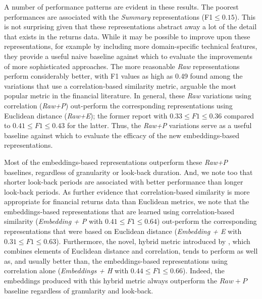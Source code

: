 \documentclass[runningheads]{llncs}
\begin{document}
A number of performance patterns are evident in these results. The poorest performances are associated with the \emph{Summary} representations (F1$\leq0.15$). This is not surprising given that these representations abstract away a lot of the detail that exists in the returns data. While it may be possible to improve upon these representations, for example by including more domain-specific technical features, they provide a useful naive baseline against which to evaluate the improvements of more sophisticated approaches. The more reasonable \emph{Raw} representations perform considerably better, with F1 values as high as 0.49 found among the variations that use a correlation-based similarity metric, arguable the most popular metric in the financial literature. In general, these \emph{Raw} variations using correlation (\emph{Raw+P}) out-perform the corresponding representations using Euclidean distance (\emph{Raw+E}); the former report with $0.33 \leq F1 \leq 0.36$ compared to $0.41 \leq F1 \leq 0.43$ for the latter. Thus, the \emph{Raw+P} variations serve as a useful baseline against which to evaluate the efficacy of the new embeddings-based representations.

Most of the embeddings-based representations outperform these \emph{Raw+P} baselines, regardless of granularity or look-back duration. And, we note too that shorter look-back periods are associated with better performance than longer look-back periods. As further evidence that correlation-based similarity is more appropriate for financial returns data than Euclidean metrics, we note that the embeddings-based representations that are learned using correlation-based similarity (\emph{Embedding + P} with $0.41 \leq F1 \leq 0.64$) out-perform the corresponding representations that were based on Euclidean distance (\emph{Embedding + E} with $0.31 \leq F1 \leq 0.63$). Furthermore, the novel, hybrid metric introduced by \cite{dolphin2021measuring}, which combines elements of Euclidean distance and correlation, tends to perform as well as, and usually better than, the embeddings-based representations using correlation alone (\emph{Embeddings + H} with $0.44 \leq F1 \leq 0.66$). Indeed, the embeddings produced with this hybrid metric always outperform the $Raw+P$ baseline regardless of granularity and look-back. 


\end{document}
